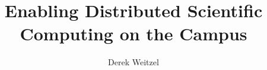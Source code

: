 \documentclass[print,phd]{nuthesis}
\begin{document}
\frontmatter

\title{Enabling Distributed Scientific Computing on the Campus}
\author{Derek Weitzel}
\maketitle
\end{document}
